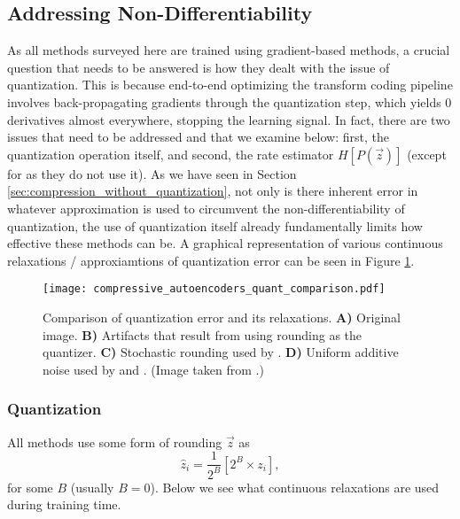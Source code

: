 \subsection{Addressing Non-Differentiability}
\label{sec:comp_quant}
\par
As all methods surveyed here are trained using gradient-based methods, a crucial
question that needs to be answered is how they dealt with the issue of
quantization. This is because end-to-end optimizing the transform coding
pipeline involves back-propagating gradients through the quantization step, which
yields 0 derivatives almost everywhere, stopping the learning signal.
In fact, there are two issues that need to be addressed and that we examine
below: first, the quantization operation itself, and second,
the rate estimator $H[P(\vec{z})]$ (except for \cite{rippel2017real} as they do
not use it). As we have
seen in Section \ref{sec:compression_without_quantization}, not only is there
inherent error in whatever approximation is used to circumvent the
non-differentiability of quantization, the use of quantization itself already
fundamentally limits how
effective these methods can be. A graphical representation of various continuous
relaxations / approxiamtions of quantization error can be seen in Figure
\ref{fig:quantization_models}. 
\begin{figure}
  \centering 
  \texttt{[image: compressive\_autoencoders\_quant\_comparison.pdf]}
  \caption{Comparison of quantization error and its relaxations. \textbf{A)}
    Original image. \textbf{B)} Artifacts that result from using rounding as the
    quantizer. \textbf{C)} Stochastic rounding used by \cite{toderici2017full}.
    \textbf{D)} Uniform additive noise used by \cite{balle2016end} and
    \cite{balle2018variational}. (Image taken from \cite{theis2017lossy}.)}
  \label{fig:quantization_models}
 \end{figure}

\subsubsection{Quantization}
\par
All methods use some form of rounding $\vec{z}$ as
\begin{equation}
\label{eq:quantization_step}
  \hat{z}_i = \frac{1}{2^B}\left[2^B \times z_i\right], 
\end{equation}
for some $B$ (usually $B = 0$). Below we see what continuous relaxations are used
during training time.
 

